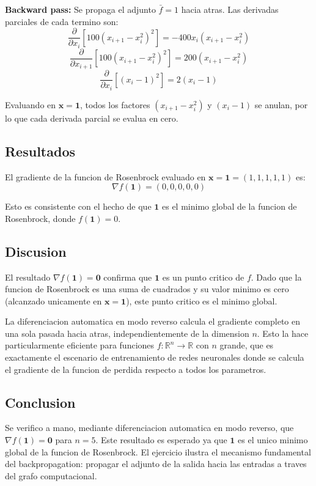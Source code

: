 \documentclass{article}
\begin{document}
\textbf{Backward pass:} Se propaga el adjunto $\bar{f} = 1$ hacia atras. Las derivadas parciales de cada termino son:
\[
\frac{\partial}{\partial x_i} \left[ 100(x_{i+1} - x_i^2)^2 \right] = -400 x_i (x_{i+1} - x_i^2)
\]
\[
\frac{\partial}{\partial x_{i+1}} \left[ 100(x_{i+1} - x_i^2)^2 \right] = 200 (x_{i+1} - x_i^2)
\]
\[
\frac{\partial}{\partial x_i} \left[ (x_i - 1)^2 \right] = 2(x_i - 1)
\]

Evaluando en $\mathbf{x} = \mathbf{1}$, todos los factores $(x_{i+1} - x_i^2)$ y $(x_i - 1)$ se anulan, por lo que cada derivada parcial se evalua en cero.

\subsection{Resultados}

El gradiente de la funcion de Rosenbrock evaluado en $\mathbf{x} = \mathbf{1} = (1,1,1,1,1)$ es:
\[
\nabla f(\mathbf{1}) = (0, 0, 0, 0, 0)
\]

Esto es consistente con el hecho de que $\mathbf{1}$ es el minimo global de la funcion de Rosenbrock, donde $f(\mathbf{1}) = 0$.

\subsection{Discusion}

El resultado $\nabla f(\mathbf{1}) = \mathbf{0}$ confirma que $\mathbf{1}$ es un punto critico de $f$. Dado que la funcion de Rosenbrock es una suma de cuadrados y su valor minimo es cero (alcanzado unicamente en $\mathbf{x} = \mathbf{1}$), este punto critico es el minimo global.

La diferenciacion automatica en modo reverso calcula el gradiente completo en una sola pasada hacia atras, independientemente de la dimension $n$. Esto la hace particularmente eficiente para funciones $f: \mathbb{R}^n \to \mathbb{R}$ con $n$ grande, que es exactamente el escenario de entrenamiento de redes neuronales donde se calcula el gradiente de la funcion de perdida respecto a todos los parametros.

\subsection{Conclusion}

Se verifico a mano, mediante diferenciacion automatica en modo reverso, que $\nabla f(\mathbf{1}) = \mathbf{0}$ para $n = 5$. Este resultado es esperado ya que $\mathbf{1}$ es el unico minimo global de la funcion de Rosenbrock. El ejercicio ilustra el mecanismo fundamental del backpropagation: propagar el adjunto de la salida hacia las entradas a traves del grafo computacional.
\end{document}
